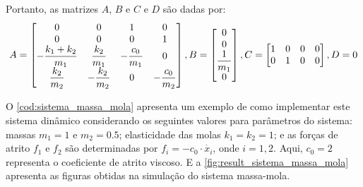 Portanto, as matrizes $A$, $B$ e $C$ e $D$ são dadas por: \begin{equation}
  A = \begin{bmatrix}
    0                                   & 0                             & 1                             & 0                             \\
    0                                   & 0                             & 0                             & 1                             \\
    \displaystyle-\frac{k_1 + k_2}{m_1} & \displaystyle\frac{k_2}{m_1}  & \displaystyle-\frac{c_0}{m_1} & 0                             \\
    \displaystyle\frac{k_2}{m_2}        & \displaystyle-\frac{k_2}{m_2} & 0                             & \displaystyle-\frac{c_0}{m_2}
  \end{bmatrix}
  , \space
  B =
  \begin{bmatrix}
    0                           \\
    0                           \\
    \displaystyle \frac{1}{m_1} \\
    0                           \\
  \end{bmatrix}
  , \space
  C =
  \begin{bmatrix}
    1 & 0 & 0 & 0 \\
    0 & 1 & 0 & 0
  \end{bmatrix}
  , \space
  D = 0
\end{equation}

O \autoref{cod:sistema_massa_mola} apresenta um exemplo de como implementar este sistema dinâmico considerando os seguintes valores para parâmetros do sistema: massas $m_1 = 1$ e $m_2 = 0.5$; elasticidade das molas $k_1 = k_2 = 1$; e as forças de atrito $f_1$ e $f_2$ são determinadas por $f_i = -c_0 \cdot \dot{x_i}$, onde $i = 1, 2$. Aqui, $c_0 = 2$ representa o coeficiente de atrito viscoso. E a \autoref{fig:result_sistema_massa_mola} apresenta as figuras obtidas na simulação do sistema massa-mola.

